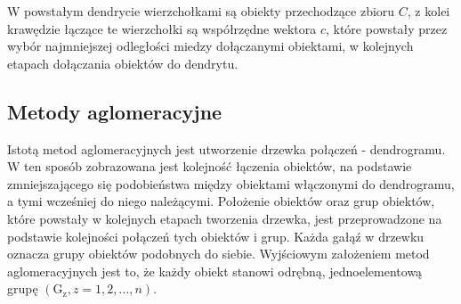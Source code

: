 \documentclass[12pt,a4paper]{report}
\begin{document}
W powstałym dendrycie wierzchołkami są obiekty przechodzące zbioru $C$, z kolei krawędzie łączące te wierzchołki są współrzędne wektora $c$, które powstały przez wybór najmniejszej odległości miedzy dołączanymi obiektami, w kolejnych etapach dołączania obiektów do dendrytu. 

\subsection{Metody aglomeracyjne}


Istotą metod aglomeracyjnych jest utworzenie drzewka połączeń - dendrogramu. W ten sposób zobrazowana jest kolejność łączenia obiektów, na podstawie zmniejszającego się podobieństwa między obiektami włączonymi do dendrogramu, a tymi wcześniej do niego należącymi. Położenie obiektów oraz grup obiektów, które powstały w kolejnych etapach tworzenia drzewka, jest przeprowadzone na podstawie kolejności połączeń tych obiektów i grup. Każda gałąź w drzewku oznacza grupy obiektów podobnych do siebie. 
Wyjściowym założeniem metod aglomeracyjnych jest to, że każdy obiekt stanowi odrębną, jednoelementową grupę $(\mathrm{G_{z}}, z=1,2,\dots,n)$.
\end{document}
